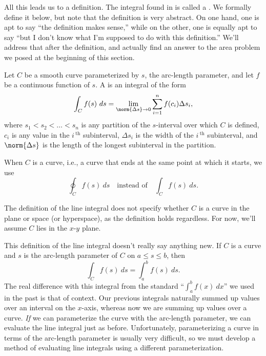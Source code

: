 All this leads us to a definition. The integral found in  is called a . We formally define it below, but note that the definition is very abstract. On one hand, one is apt to say ``the definition makes sense,'' while on the other, one is equally apt to say ``but I don't know what I'm supposed to do with this definition.'' We'll address that after the definition, and actually find an answer to the area problem we posed at the beginning of this section.


\begin{definition}\label{def:line_integral1}
Let $C$ be a smooth curve parameterized by $s$, the arc-length parameter, and let $f$ be a continuous function of $s$. A  is an integral of the form
\[\int_C f(s)\ ds = \lim_{\norm{\Delta s}\to 0}\sum_{i=1}^n f(c_i)\Delta s_i,\]
where $s_1<s_2<\dots<s_n$ is any partition of the $s$-interval over which $C$ is defined, $c_i$ is any value in the $i\,^\text{th}$ subinterval,  $\Delta s_i$ is the width of the $i\,^\text{th}$ subinterval, and $\norm{\Delta s}$ is the length of the longest subinterval in the partition.
\end{definition}

When $C$ is a  curve, i.e., a curve that ends at the same point at which it starts,  we use
\[\oint_C f(s)\ ds \quad \text{instead of}\quad \int_Cf(s)\ ds.\]

The definition of the line integral does not specify whether $C$ is a curve in the plane or space (or hyperspace), as the definition holds regardless. For now, we'll assume $C$ lies in the $x$-$y$ plane.

This definition of the line integral  doesn't really say anything new. If $C$ is a curve and $s$ is the arc-length parameter of $C$ on $a\leq s\leq b$, then 
\[\int_Cf(s)\ ds = \int_a^bf(s)\ ds.\]
The real difference with this integral from the standard ``$\int_a^bf(x)\ dx$'' we used in the past is that of context. Our previous integrals naturally summed up values over an interval on the $x$-axis, whereas now we are summing up values over a curve. \emph{If} we can parameterize the curve with the arc-length parameter, we can evaluate the line integral just as before. Unfortunately, parameterizing a curve in terms of the arc-length parameter is usually very difficult, so we must develop a method of evaluating line integrals using a different parameterization.

